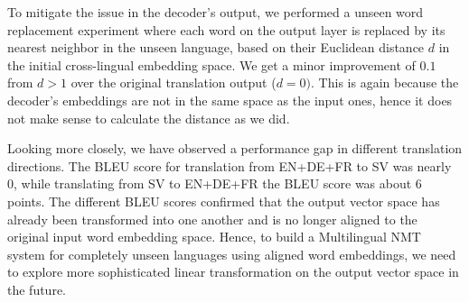 \documentclass[11pt,a4paper]{article}
\begin{document}
To mitigate the issue in the decoder's output, we performed a unseen word replacement experiment where each word on the output layer is replaced by its nearest neighbor in the unseen language, based on their Euclidean distance $d$ in the initial cross-lingual embedding space. 
We get a minor improvement of $0.1$ from $d>1$ over the original translation output ($d=0)$. 
This is again because the decoder's embeddings are not in the same space as the input ones, hence it does not make sense to calculate the distance as we did. 

Looking more closely, we have observed a performance gap in different translation directions. The BLEU score for translation from EN+DE+FR to SV was nearly 0, while translating from SV to EN+DE+FR the BLEU score was about 6 points. The different BLEU scores confirmed that the output vector space has already been transformed into one another and is no longer aligned to the original input word embedding space. Hence, to build a Multilingual NMT system for completely unseen languages using aligned word embeddings, we need to explore more sophisticated linear transformation on the output vector space in the future.


\end{document}
